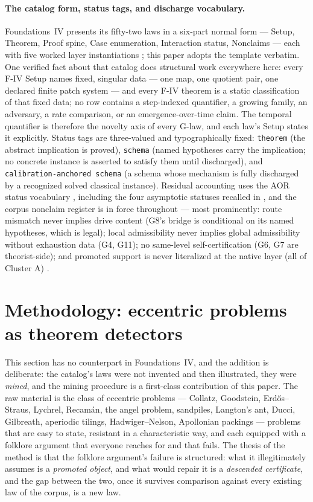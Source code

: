 \documentclass[11pt]{article}
\newcommand{\FoundIV}{Foundations~IV}
\theoremstyle{definition}
\begin{document}
\paragraph{The catalog form, status tags, and discharge vocabulary.} \FoundIV{} presents its
fifty-two laws in a six-part normal form --- Setup, Theorem, Proof spine, Case enumeration,
Interaction status, Nonclaims --- each with five worked layer instantiations
\citep{Tsiokos2026FoundIV}; this paper adopts the template verbatim. One verified fact about that
catalog does structural work everywhere here: every F-IV Setup names fixed, singular data --- one
map, one quotient pair, one declared finite patch system --- and every F-IV theorem is a static
classification of that fixed data; no row contains a step-indexed quantifier, a growing family, an
adversary, a rate comparison, or an emergence-over-time claim. The temporal quantifier is therefore
the novelty axis of every G-law, and each law's Setup states it explicitly. Status tags are
three-valued and typographically fixed: \texttt{theorem} (the abstract implication is proved),
\texttt{schema} (named hypotheses carry the implication; no concrete instance is asserted to satisfy
them until discharged), and \texttt{calibration-anchored schema} (a schema whose mechanism is fully
discharged by a recognized solved classical instance). Residual accounting uses the AOR status
vocabulary \citep{Tsiokos2026AOR}, including the four asymptotic statuses recalled in
, and the corpus nonclaim register is in force throughout --- most
prominently: route mismatch never implies drive content (G8's bridge is conditional on its named
hypotheses, which is legal); local admissibility never implies global admissibility without
exhaustion data (G4, G11); no same-level self-certification (G6, G7 are theorist-side); and promoted
support is never literalized at the native layer (all of Cluster A)
\citep{Tsiokos2026FoundIII}.

\section{Methodology: eccentric problems as theorem detectors}\label{sec:methodology}

This section has no counterpart in \FoundIV{}, and the addition is deliberate: the catalog's laws were
not invented and then illustrated, they were \emph{mined}, and the mining procedure is a first-class
contribution of this paper. The raw material is the class of eccentric problems --- Collatz,
Goodstein, Erd\H{o}s--Straus, Lychrel, Recam\'an, the angel problem, sandpiles, Langton's ant, Ducci,
Gilbreath, aperiodic tilings, Hadwiger--Nelson, Apollonian packings --- problems that are easy to
state, resistant in a characteristic way, and each equipped with a folklore argument that everyone
reaches for and that fails. The thesis of the method is that the folklore argument's failure is
structured: what it illegitimately assumes is a \emph{promoted object}, and what would repair it is a
\emph{descended certificate}, and the gap between the two, once it survives comparison against every
existing law of the corpus, is a new law.
\end{document}

